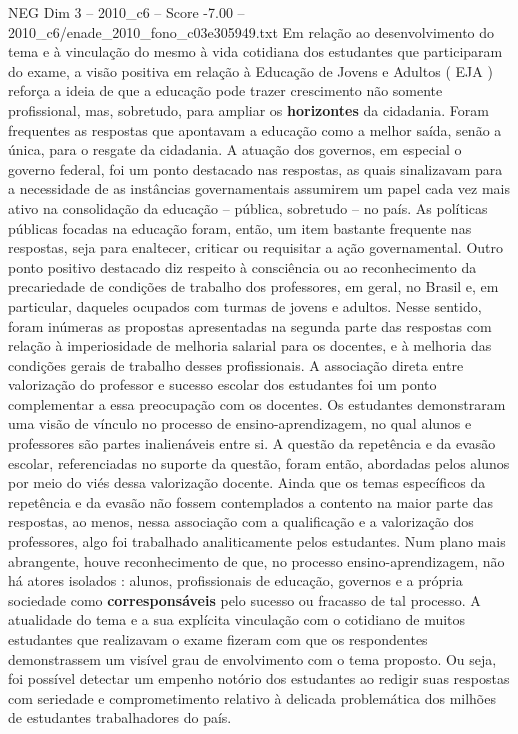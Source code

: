 \begin{textsample}{NEG Dim 3 – 2010\_c6 – Score -7.00 – 2010\_c6/enade\_2010\_fono\_c03e305949.txt}
Em relação ao desenvolvimento do tema e à vinculação do mesmo à vida cotidiana dos estudantes que participaram do exame, a visão positiva em relação à Educação de Jovens e Adultos ( EJA ) reforça a ideia de que a educação pode trazer crescimento não somente profissional, mas, sobretudo, para ampliar os \textbf{horizontes} da cidadania.
Foram frequentes as respostas que apontavam a educação como a melhor saída, senão a única, para o resgate da cidadania.
A atuação dos governos, em especial o governo federal, foi um ponto destacado nas respostas, as quais sinalizavam para a necessidade de as instâncias governamentais assumirem um papel cada vez mais ativo na consolidação da educação – pública, sobretudo – no país.
As políticas públicas focadas na educação foram, então, um item bastante frequente nas respostas, seja para enaltecer, criticar ou requisitar a ação governamental.
Outro ponto positivo destacado diz respeito à consciência ou ao reconhecimento da precariedade de condições de trabalho dos professores, em geral, no Brasil e, em particular, daqueles ocupados com turmas de jovens e adultos.
Nesse sentido, foram inúmeras as propostas apresentadas na segunda parte das respostas com relação à imperiosidade de melhoria salarial para os docentes, e à melhoria das condições gerais de trabalho desses profissionais.
A associação direta entre valorização do professor e sucesso escolar dos estudantes foi um ponto complementar a essa preocupação com os docentes.
Os estudantes demonstraram uma visão de vínculo no processo de ensino-aprendizagem, no qual alunos e professores são partes inalienáveis entre si.
A questão da repetência e da evasão escolar, referenciadas no suporte da questão, foram então, abordadas pelos alunos por meio do viés dessa valorização docente.
Ainda que os temas específicos da repetência e da evasão não fossem contemplados a contento na maior parte das respostas, ao menos, nessa associação com a qualificação e a valorização dos professores, algo foi trabalhado analiticamente pelos estudantes.
Num plano mais abrangente, houve reconhecimento de que, no processo ensino-aprendizagem, não há atores isolados : alunos, profissionais de educação, governos e a própria sociedade como \textbf{corresponsáveis} pelo sucesso ou fracasso de tal processo.
A atualidade do tema e a sua explícita vinculação com o cotidiano de muitos estudantes que realizavam o exame fizeram com que os respondentes demonstrassem um visível grau de envolvimento com o tema proposto.
Ou seja, foi possível detectar um empenho notório dos estudantes ao redigir suas respostas com seriedade e comprometimento relativo à delicada problemática dos milhões de estudantes trabalhadores do país.

\end{textsample}
